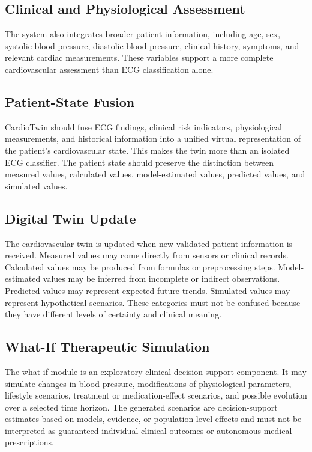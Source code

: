 \subsection{Clinical and Physiological Assessment}
The system also integrates broader patient information, including age, sex, systolic blood pressure, diastolic blood pressure, clinical history, symptoms, and relevant cardiac measurements. These variables support a more complete cardiovascular assessment than ECG classification alone.

\subsection{Patient-State Fusion}
CardioTwin should fuse ECG findings, clinical risk indicators, physiological measurements, and historical information into a unified virtual representation of the patient's cardiovascular state. This makes the twin more than an isolated ECG classifier. The patient state should preserve the distinction between measured values, calculated values, model-estimated values, predicted values, and simulated values.

\subsection{Digital Twin Update}
The cardiovascular twin is updated when new validated patient information is received. Measured values may come directly from sensors or clinical records. Calculated values may be produced from formulas or preprocessing steps. Model-estimated values may be inferred from incomplete or indirect observations. Predicted values may represent expected future trends. Simulated values may represent hypothetical scenarios. These categories must not be confused because they have different levels of certainty and clinical meaning.

\subsection{What-If Therapeutic Simulation}
The what-if module is an exploratory clinical decision-support component. It may simulate changes in blood pressure, modifications of physiological parameters, lifestyle scenarios, treatment or medication-effect scenarios, and possible evolution over a selected time horizon. The generated scenarios are decision-support estimates based on models, evidence, or population-level effects and must not be interpreted as guaranteed individual clinical outcomes or autonomous medical prescriptions.

